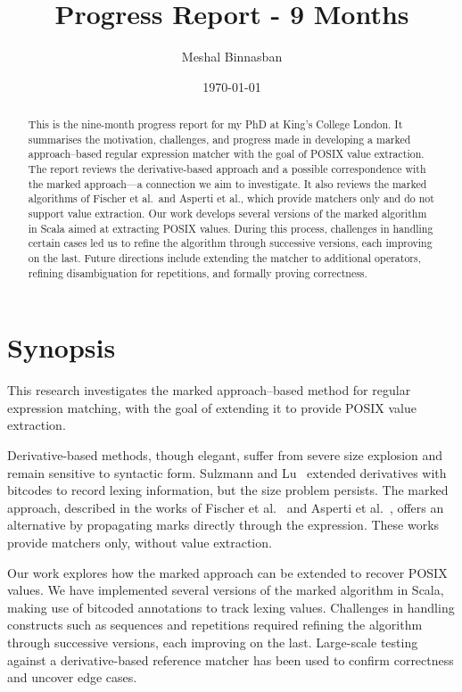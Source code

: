 \documentclass[12pt]{article}
\title{Progress Report - 9 Months}
\author{Meshal Binnasban}
\date{\today}
\begin{document}
\maketitle

\begin{abstract}
This is the nine-month progress report for my PhD at King’s College London.  
It summarises the motivation, challenges, and progress made in developing a marked approach--based regular expression matcher with the goal of POSIX value extraction.  
The report reviews the derivative-based approach and a possible correspondence with the marked approach—a connection we aim to investigate.  
It also reviews the marked algorithms of Fischer et al.\ and Asperti et al., which provide matchers only and do not support value extraction.  
Our work develops several versions of the marked algorithm in Scala aimed at extracting POSIX values.  
During this process, challenges in handling certain cases led us to refine the algorithm through successive versions, each improving on the last.  
Future directions include extending the matcher to additional operators, refining disambiguation for repetitions, and formally proving correctness.  
\end{abstract}


\newpage
\section*{Synopsis}
This research investigates the marked approach--based method for regular expression 
matching, with the goal of extending it to provide POSIX value extraction.

Derivative-based methods, though elegant, suffer from severe size explosion and remain sensitive to syntactic form.  
Sulzmann and Lu~\cite{Sulzmann2014} extended derivatives with bitcodes to record lexing information, but the size problem persists.  
The marked approach, described in the works of Fischer et al.~\cite{Fischer2010} and Asperti et al.~\cite{Asperti2010}, offers an alternative by propagating marks directly through the expression.  
These works provide matchers only, without value extraction.  

Our work explores how the marked approach can be extended to recover POSIX values.  
We have implemented several versions of the marked algorithm in Scala, making use of bitcoded annotations to track lexing values.  
Challenges in handling constructs such as sequences and repetitions required refining the algorithm through successive versions, each improving on the last.  
Large-scale testing against a derivative-based reference matcher has been used to confirm correctness and uncover edge cases.  
\end{document}
